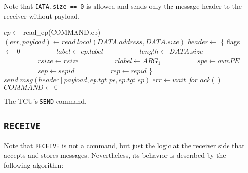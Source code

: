 Note that \texttt{DATA.size == 0} is allowed and sends only the message header to the receiver
without payload.

\begin{algorithm}
    $ep \gets$ read\_ep(COMMAND.ep)\;
    \extend{}
    \BlankLine
    \BlankLine
    $(err, payload) \gets read\_local(DATA.address, DATA.size)$\;
    \BlankLine
    \BlankLine
    $header \gets$ \{ flags $\gets$ 0\;
    $\quad\quad\quad\quad\quad label \gets ep.label$\;
    $\quad\quad\quad\quad\quad length \gets DATA.size$\;
    $\quad\quad\quad\quad\quad rsize \gets rsize$\;
    $\quad\quad\quad\quad\quad rlabel \gets ARG_1$\;
    $\quad\quad\quad\quad\quad spe \gets ownPE$\;
    $\quad\quad\quad\quad\quad sep \gets sepid$\;
    $\quad\quad\quad\quad\quad rep \gets repid$ \}\;
    $send\_msg(header\ |\ payload, ep.tgt\_pe, ep.tgt\_ep)$\;
    $err \gets wait\_for\_ack()$\;
    \BlankLine
    $COMMAND \gets 0$\;
    \caption{The TCU's \texttt{SEND} command.}
\end{algorithm}

\subsection{\texttt{RECEIVE}}

Note that \texttt{RECEIVE} is not a command, but just the logic at the receiver side that accepts
and stores messages. Nevertheless, its behavior is described by the following algorithm:

